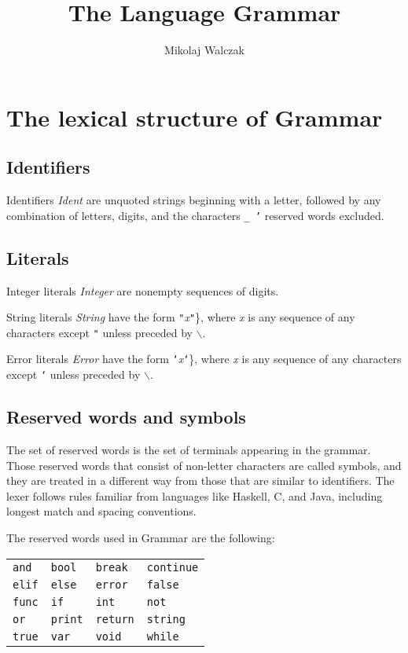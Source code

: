 \documentclass{article}
\title{The Language Grammar}
\author{Mikolaj Walczak}
\begin{document}
\maketitle
\clearpage

\section{The lexical structure of Grammar}

\subsection{Identifiers}

Identifiers \textit{Ident} are unquoted strings beginning with a letter,
followed by any combination of letters, digits, and the characters \texttt{\_ '}
reserved words excluded.

\subsection{Literals}

Integer literals \textit{Integer} are nonempty sequences of digits.

String literals \textit{String} have the form
\texttt{"}\textit{x}\texttt{"}\}, where \textit{x} is any sequence of any characters
except \texttt{"} unless preceded by \texttt{$\backslash$}.

Error literals \textit{Error} have the form
\texttt{`}\textit{x}\texttt{`}\}, where \textit{x} is any sequence of any characters
except \texttt{`} unless preceded by \texttt{$\backslash$}.

\subsection{Reserved words and symbols}

The set of reserved words is the set of terminals appearing in the grammar.
Those reserved words that consist of non-letter characters are called symbols,
and they are treated in a different way from those that are similar to
identifiers. The lexer follows rules familiar from languages like Haskell,
C, and Java, including longest match and spacing conventions.

The reserved words used in Grammar are the following:

\begin{center}\begin{tabular}{llll}
\texttt{and} & \texttt{bool} & \texttt{break} & \texttt{continue} \\
\texttt{elif} & \texttt{else} & \texttt{error} & \texttt{false} \\
\texttt{func} & \texttt{if} & \texttt{int} & \texttt{not} \\
\texttt{or} & \texttt{print} & \texttt{return} & \texttt{string} \\
\texttt{true} & \texttt{var} & \texttt{void} & \texttt{while} \\
\end{tabular}\end{center}
\end{document}
